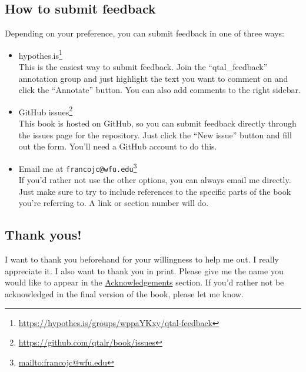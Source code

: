 \documentclass[
  letterpaper,
  DIV=11,
  numbers=noendperiod]{scrreport}
\theoremstyle{definition}
\theoremstyle{remark}
\DeclareRobustCommand{\href}[2]{#2\footnote{\url{#1}}}
\begin{document}
\hypertarget{how-to-submit-feedback}{%
\subsection*{How to submit feedback}\label{how-to-submit-feedback}}

Depending on your preference, you can submit feedback in one of three
ways:

\begin{itemize}
\item
  \href{https://hypothes.is/groups/wppaYKxy/qtal-feedback}{hypothes.is}\\
  This is the easiest way to submit feedback. Join the
  ``qtal\_feedback'' annotation group and just highlight the text you
  want to comment on and click the ``Annotate'' button. You can also add
  comments to the right sidebar.
\item
  \href{https://github.com/qtalr/book/issues}{GitHub issues}\\
  This book is hosted on GitHub, so you can submit feedback directly
  through the issues page for the repository. Just click the ``New
  issue'' button and fill out the form. You'll need a GitHub account to
  do this.
\item
  Email me at
  \href{mailto:francojc@wfu.edu}{\nolinkurl{francojc@wfu.edu}}\\
  If you'd rather not use the other options, you can always email me
  directly. Just make sure to try to include references to the specific
  parts of the book you're referring to. A link or section number will
  do.
\end{itemize}

\hypertarget{thank-yous}{%
\subsection*{Thank yous!}\label{thank-yous}}

I want to thank you beforehand for your willingness to help me out. I
really appreciate it. I also want to thank you in print. Please give me
the name you would like to appear in the
\protect\hyperlink{acknowledgements}{Acknowledgements} section. If you'd
rather not be acknowledged in the final version of the book, please let
me know.



\printindex
\end{document}
